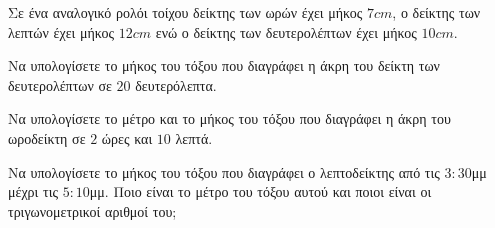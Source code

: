 Σε ένα αναλογικό ρολόι τοίχου δείκτης των ωρών έχει μήκος $ 7cm $, ο δείκτης των λεπτών έχει μήκος $ 12cm $ ενώ ο δείκτης των δευτερολέπτων έχει μήκος $ 10cm $.
\begin{center}
\end{center}
\begin{rlist}
\item Να υπολογίσετε το μήκος του τόξου που διαγράφει η άκρη του δείκτη των δευτερολέπτων σε $ 20 $ δευτερόλεπτα.
\item Να υπολογίσετε το μέτρο και το μήκος του τόξου που διαγράφει η άκρη του ωροδείκτη σε $ 2 $ ώρες και $ 10 $ λεπτά.
\item Να υπολογίσετε το μήκος του τόξου που διαγράφει ο λεπτοδείκτης από τις $ 3:30 $μμ μέχρι τις $ 5:10 $μμ. Ποιο είναι το μέτρο του τόξου αυτού και ποιοι είναι οι τριγωνομετρικοί αριθμοί του;
\end{rlist}

